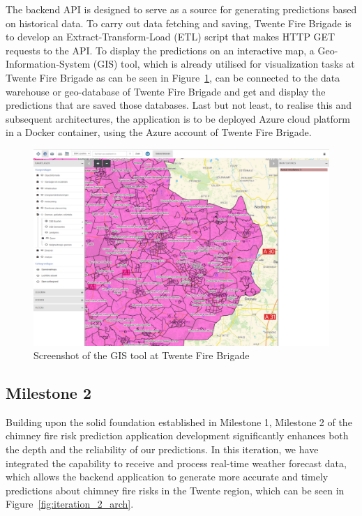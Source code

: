 \documentclass{utitcphd_overleaf}
\begin{document}
The backend API is designed to serve as a source for generating predictions based on historical data. To carry out data fetching and saving, Twente Fire Brigade is to develop an Extract-Transform-Load (ETL) script that makes HTTP GET requests to the API. To display the predictions on an interactive map, a Geo-Information-System (GIS) tool, which is already utilised for visualization tasks at Twente Fire Brigade as can be seen in Figure~\ref{fig:iteration_1_gis}, can be connected to the data warehouse or geo-database of Twente Fire Brigade and get and display the predictions that are saved those databases. Last but not least, to realise this and subsequent architectures, the application is to be deployed Azure cloud platform in a Docker container, using the Azure account of Twente Fire Brigade.

\begin{figure}[ht]
  \centering
  \includegraphics[width=1\textwidth]{my_images/milestones/iteration_1_gis.png}
  \caption{Screenshot of the GIS tool at Twente Fire Brigade}
  \label{fig:iteration_1_gis}
\end{figure}

\subsection{Milestone 2}

Building upon the solid foundation established in Milestone 1, Milestone 2 of the chimney fire risk prediction application development significantly enhances both the depth and the reliability of our predictions. In this iteration, we have integrated the capability to receive and process real-time weather forecast data, which allows the backend application to generate more accurate and timely predictions about chimney fire risks in the Twente region, which can be seen in Figure~\ref{fig:iteration_2_arch}.
\end{document}
